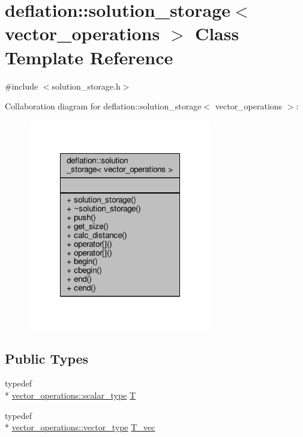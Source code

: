 \hypertarget{classdeflation_1_1solution__storage}{\section{deflation\-:\-:solution\-\_\-storage$<$ vector\-\_\-operations $>$ Class Template Reference}
\label{classdeflation_1_1solution__storage}
}


{\ttfamily \#include $<$solution\-\_\-storage.\-h$>$}



Collaboration diagram for deflation\-:\-:solution\-\_\-storage$<$ vector\-\_\-operations $>$\-:\nopagebreak
\begin{figure}[H]
\begin{center}
\leavevmode
\includegraphics[width=228pt]{classdeflation_1_1solution__storage__coll__graph}
\end{center}
\end{figure}
\subsection*{Public Types}
\begin{DoxyCompactItemize}
\item 
typedef \\*
\hyperlink{structcpu__vector__operations_aca6b216aa1fb172df83d98350e94fd61}{vector\-\_\-operations\-::scalar\-\_\-type} \hyperlink{classdeflation_1_1solution__storage_af347bcf3081cfa0fcd03015ba347e964}{T}
\item 
typedef \\*
\hyperlink{structcpu__vector__operations_a1962836df596ce262704d208e9a6d8f9}{vector\-\_\-operations\-::vector\-\_\-type} \hyperlink{classdeflation_1_1solution__storage_ae65226dde857949785c573bf1bd448a7}{T\-\_\-vec}
\end{DoxyCompactItemize}
